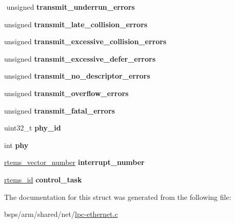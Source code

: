 \begin{DoxyCompactItemize}
$$\mbox{\label{structlpc__eth__driver__entry_ace19addc8d71be9276bc9072e50fbfa8}} 
unsigned {\bfseries transmit\+\_\+underrun\+\_\+errors}
\item 
\mbox{\label{structlpc__eth__driver__entry_afb9eac4b7578059653873eaf7963fcb8}} 
unsigned {\bfseries transmit\+\_\+late\+\_\+collision\+\_\+errors}
\item 
\mbox{\label{structlpc__eth__driver__entry_a740614c5386f6ad2319c51b4d900c2fc}} 
unsigned {\bfseries transmit\+\_\+excessive\+\_\+collision\+\_\+errors}
\item 
\mbox{\label{structlpc__eth__driver__entry_a33e35b4269b2a34b22ea21266c49d356}} 
unsigned {\bfseries transmit\+\_\+excessive\+\_\+defer\+\_\+errors}
\item 
\mbox{\label{structlpc__eth__driver__entry_a4f15efdb79d672d8f6ed46c76d388b93}} 
unsigned {\bfseries transmit\+\_\+no\+\_\+descriptor\+\_\+errors}
\item 
\mbox{\label{structlpc__eth__driver__entry_a17941a432561431bbc1cde53b2a5c66b}} 
unsigned {\bfseries transmit\+\_\+overflow\+\_\+errors}
\item 
\mbox{\label{structlpc__eth__driver__entry_a83ceddd9cbce595cc001ad60441fc8a0}} 
unsigned {\bfseries transmit\+\_\+fatal\+\_\+errors}
\item 
\mbox{\label{structlpc__eth__driver__entry_a421a517abc2c21f7bc0f87071432fd4b}} 
uint32\+\_\+t {\bfseries phy\+\_\+id}
\item 
\mbox{\label{structlpc__eth__driver__entry_a5e1c9e0b5894eba2a172386596facdfc}} 
int {\bfseries phy}
\item 
\mbox{\label{structlpc__eth__driver__entry_ac7d1c13588b74569ec6c7aa7f4ab8006}} 
\mbox{\hyperlink{group__ClassicINTR_ga3e434c197d99f128e78cae4d9358bd8b}{rtems\+\_\+vector\+\_\+number}} {\bfseries interrupt\+\_\+number}
\item 
\mbox{\label{structlpc__eth__driver__entry_a59c8a8888ce1d1a9483fac2343001d52}} 
\mbox{\hyperlink{group__ClassicTasks_gab20892b814dced7dd4e5b9bf42becd57}{rtems\+\_\+id}} {\bfseries control\+\_\+task}
\end{DoxyCompactItemize}


The documentation for this struct was generated from the following file\+:\begin{DoxyCompactItemize}
\item 
bsps/arm/shared/net/\mbox{\hyperlink{lpc-ethernet_8c}{lpc-\/ethernet.\+c}}\end{DoxyCompactItemize}
